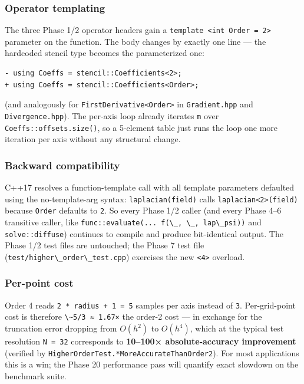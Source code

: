 \subsubsection{Operator templating}\label{operator-templating}

The three Phase 1/2 operator headers gain a
\passthrough{\lstinline!template <int Order = 2>!} parameter on the
function. The body changes by exactly one line --- the hardcoded stencil
type becomes the parameterized one:

\begin{lstlisting}
- using Coeffs = stencil::Coefficients<2>;
+ using Coeffs = stencil::Coefficients<Order>;
\end{lstlisting}

(and analogously for \passthrough{\lstinline!FirstDerivative<Order>!} in
\passthrough{\lstinline!Gradient.hpp!} and
\passthrough{\lstinline!Divergence.hpp!}). The per-axis loop already
iterates \passthrough{\lstinline!m!} over
\passthrough{\lstinline!Coeffs::offsets.size()!}, so a 5-element table
just runs the loop one more iteration per axis without any structural
change.

\subsubsection{Backward compatibility}\label{backward-compatibility}

C++17 resolves a function-template call with all template parameters
defaulted using the no-template-arg syntax:
\passthrough{\lstinline!laplacian(field)!} calls
\passthrough{\lstinline!laplacian<2>(field)!} because
\passthrough{\lstinline!Order!} defaults to \passthrough{\lstinline!2!}.
So every Phase 1/2 caller (and every Phase 4--6 transitive caller, like
\passthrough{\lstinline!func::evaluate(... f(\_, \_, lap\_psi))!} and
\passthrough{\lstinline!solve::diffuse!}) continues to compile and
produce bit-identical output. The Phase 1/2 test files are untouched;
the Phase 7 test file
(\passthrough{\lstinline!test/higher\_order\_test.cpp!}) exercises the
new \passthrough{\lstinline!<4>!} overload.

\subsubsection{Per-point cost}\label{per-point-cost}

Order 4 reads \passthrough{\lstinline!2 * radius + 1 = 5!} samples per
axis instead of \passthrough{\lstinline!3!}. Per-grid-point cost is
therefore \passthrough{\lstinline!\~5/3 ≈ 1.67×!} the order-2 cost ---
in exchange for the truncation error dropping from \(O(h^2)\) to
\(O(h^4)\), which at the typical test resolution
\passthrough{\lstinline!N = 32!} corresponds to \textbf{10--100×
absolute-accuracy improvement} (verified by
\passthrough{\lstinline!HigherOrderTest.*MoreAccurateThanOrder2!}). For
most applications this is a win; the Phase 20 performance pass will
quantify exact slowdown on the benchmark suite.

